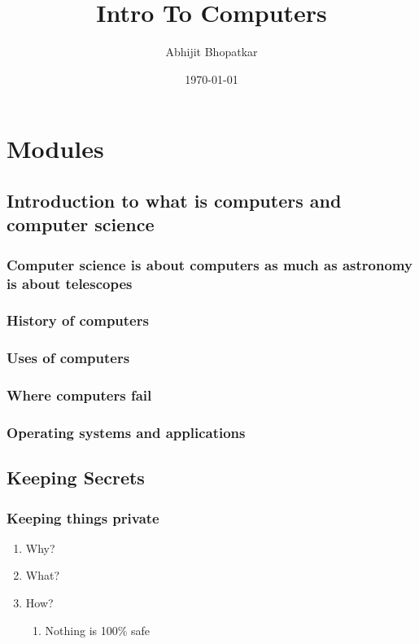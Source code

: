 \documentclass[11pt]{article}
\author{Abhijit Bhopatkar}
\date{\today}
\title{Intro To Computers}
\begin{document}
\maketitle
\tableofcontents


\section{Modules}
\label{sec:org9d3d39c}
\subsection{Introduction to what is computers and computer science}
\label{sec:org54d3752}
\subsubsection{Computer science is about computers as much as astronomy is about telescopes}
\label{sec:org15ce756}
\subsubsection{History of computers}
\label{sec:orgff823bf}
\subsubsection{Uses of computers}
\label{sec:orga96a375}
\subsubsection{Where computers fail}
\label{sec:org00d5579}
\subsubsection{Operating systems and applications}
\label{sec:orgd6c16ae}
\subsection{Keeping Secrets}
\label{sec:org7e7cf47}
\subsubsection{Keeping things private}
\label{sec:org402f5e7}
\begin{enumerate}
\item Why?
\label{sec:org0299f15}
\item What?
\label{sec:org34b8dd9}
\item How?
\label{sec:orgd01e08a}
\begin{enumerate}
\item Nothing is 100\% safe
\label{sec:org53c24c5}
\end{enumerate}
\end{enumerate}
\end{document}
